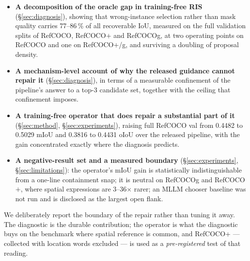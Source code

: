 \begin{itemize}
\item \textbf{A decomposition of the oracle gap in training-free RIS}
(§\ref{sec:diagnosis}), showing that wrong-instance selection rather than mask
quality carries 77--86\,\% of all recoverable IoU, measured on the full
validation splits of RefCOCO, RefCOCO$+$ and RefCOCOg, at two operating points
on RefCOCO and one on RefCOCO$+$/g, and surviving a doubling of proposal
density.
\item \textbf{A mechanism-level account of why the released guidance cannot
repair it} (§\ref{sec:diagnosis}), in terms of a measurable confinement of the
pipeline's answer to a top-3 candidate set, together with the ceiling that
confinement imposes.
\item \textbf{A training-free operator that does repair a substantial part of
it} (§\ref{sec:method}, §\ref{sec:experiments}), raising full RefCOCO val from
0.4482 to 0.5029 mIoU and 0.3816 to 0.4431 oIoU over the released pipeline,
with the gain concentrated exactly where the diagnosis predicts.
\item \textbf{A negative-result set and a measured boundary} (§\ref{sec:experiments}, §\ref{sec:limitations}): the operator's
mIoU gain is statistically indistinguishable from a one-line containment snap;
it is neutral on RefCOCOg and RefCOCO$+$, where spatial expressions are 3--36$\times$
rarer; an MLLM chooser baseline was not run and is disclosed as the largest
open flank.
\end{itemize}

We deliberately report the boundary of the repair rather than tuning it away.
The diagnostic is the durable contribution; the operator is what the diagnostic
buys on the benchmark where spatial reference is common, and RefCOCO+ ---
collected with location words excluded --- is used as a \emph{pre-registered}
test of that reading.
